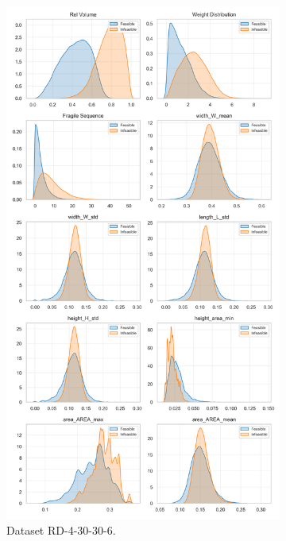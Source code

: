 \begin{figure}[!ht]
	\centering
	\begin{subfigure}[t]{0.49\textwidth}
		\centering
		\caption{Dataset RD-4-30-30-6.}
		\includegraphics[width=\textwidth]{pictures/dataset_structure/Distribution_CPStatus_RandomDataset.png}
	\end{subfigure}%
	\begin{subfigure}[t]{0.49\textwidth}

\end{subfigure}
\end{figure}
